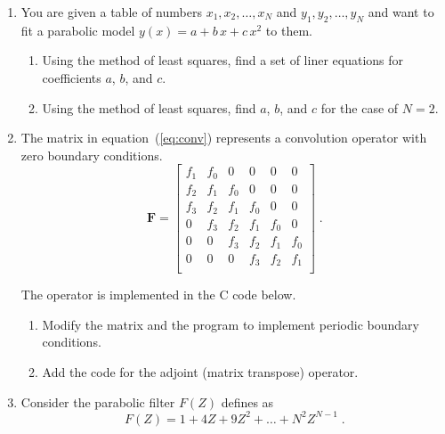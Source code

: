 \begin{enumerate}

\item You are given a table of numbers $x_1, x_2, \ldots, x_N$ and $y_1, y_2, \ldots, y_N$ and 
want to fit a parabolic model $y(x) = a + b\,x + c\,x^2$ to them.

\begin{enumerate}
\item Using the method of least squares, find a set of liner equations for coefficients $a$, $b$, and $c$.
\item Using the method of least squares, find $a$, $b$, and $c$ for the case of $N=2$.
\end{enumerate}

\item The matrix in equation~(\ref{eq:conv}) represents a convolution operator with zero boundary conditions.
\begin{equation}
\label{eq:conv}
\mathbf{F} = \left[\begin{array}{llllll}
f_1 & f_0 & 0   & 0   & 0   & 0   \\
f_2 & f_1 & f_0 & 0   & 0   & 0   \\
f_3 & f_2 & f_1 & f_0 & 0   & 0   \\
0   & f_3 & f_2 & f_1 & f_0 & 0   \\
0   & 0   & f_3 & f_2 & f_1 & f_0 \\
0   & 0   & 0   & f_3 & f_2 & f_1 \\
\end{array}\right]\;.
\end{equation}

The operator is implemented in the C code below.

\lstset{language=c,numbers=left,numberstyle=\tiny,showstringspaces=false}


\begin{enumerate}
\item Modify the matrix and the program to implement periodic boundary conditions.
\item Add the code for the adjoint (matrix transpose) operator.
\end{enumerate}

\item Consider the parabolic filter $F(Z)$ defines as
\begin{equation}
\label{eq:parab}
F(Z) = 1 + 4 Z + 9 Z^2 + \ldots + N^2 Z^{N-1}\;.
\end{equation} 


\end{enumerate}
